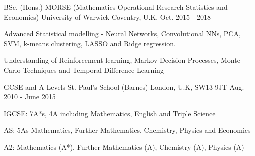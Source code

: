 

\begin{cventries}

  \cventry
    {BSc. (Hons.) MORSE (Mathematics Operational Research Statistics and Economics)} %
    {University of Warwick} %
    {Coventry, U.K.} %
    {Oct. 2015 - 2018} %
    {
      \begin{cvitems} %
        \item{Advanced Statistical modelling - Neural Networks, Convolutional NNs, PCA, SVM, k-means clustering, LASSO and Ridge regression.}
        \item{Understanding of Reinforcement learning, Markov Decision Processes, Monte Carlo Techniques and Temporal Difference Learning}
      \end{cvitems}
    }
    
  \cventry
   {GCSE and A Levels}
   {St. Paul's School (Barnes)}
   {London, U.K, SW13 9JT}
   {Aug. 2010 - June 2015}
   {
     \begin{cvitems}
	\item{IGCSE: 7A*s, 4A including Mathematics, English and Triple Science}
	\item{AS: 5As Mathematics, Further Mathematics, Chemistry, Physics and Economics}
	\item{A2: Mathematics (A*), Further Mathematics (A), Chemistry (A), Physics (A)}
     \end{cvitems}
  }

\end{cventries}